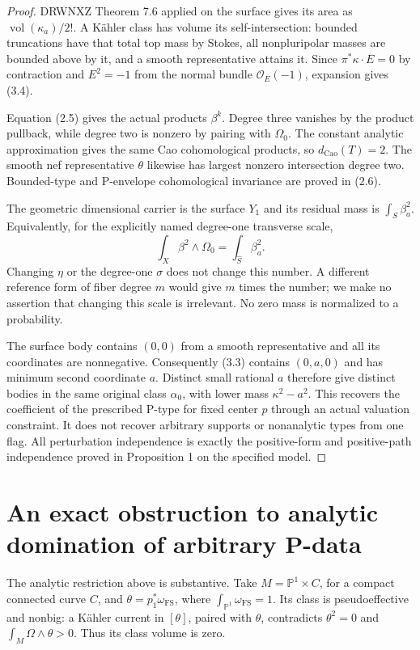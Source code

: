 \documentclass[11pt]{article}
\newcommand{\Ca}{\mathrm{Cao}}
\newcommand{\vol}{\operatorname{vol}}
\begin{document}
\begin{proof}
DRWNXZ Theorem 7.6 applied on the surface gives its area as $\vol(\kappa_a)/2!$. A K\"ahler class has volume its self-intersection: bounded truncations have that total top mass by Stokes, all nonpluripolar masses are bounded above by it, and a smooth representative attains it. Since $\pi^*\kappa\cdot E=0$ by contraction and $E^2=-1$ from the normal bundle $\mathcal O_E(-1)$, expansion gives (3.4).

Equation (2.5) gives the actual products $\beta^k$. Degree three vanishes by the product pullback, while degree two is nonzero by pairing with $\Omega_0$. The constant analytic approximation gives the same Cao cohomological products, so $d_{\Ca}(T)=2$. The smooth nef representative $\theta$ likewise has largest nonzero intersection degree two. Bounded-type and P-envelope cohomological invariance are proved in (2.6).

The geometric dimensional carrier is the surface $Y_1$ and its residual mass is $\int_{\widehat S}\beta_a^2$. Equivalently, for the explicitly named degree-one transverse scale,
\[
 \int_X\beta^2\wedge\Omega_0=\int_{\widehat S}\beta_a^2.
\]
Changing $\eta$ or the degree-one $\sigma$ does not change this number. A different reference form of fiber degree $m$ would give $m$ times the number; we make no assertion that changing this scale is irrelevant. No zero mass is normalized to a probability.

The surface body contains $(0,0)$ from a smooth representative and all its coordinates are nonnegative. Consequently (3.3) contains $(0,a,0)$ and has minimum second coordinate $a$. Distinct small rational $a$ therefore give distinct bodies in the same original class $\alpha_0$, with lower mass $\kappa^2-a^2$. This recovers the coefficient of the prescribed P-type for fixed center $p$ through an actual valuation constraint. It does not recover arbitrary supports or nonanalytic types from one flag. All perturbation independence is exactly the positive-form and positive-path independence proved in Proposition 1 on the specified model.
\end{proof}

\section{An exact obstruction to analytic domination of arbitrary P-data}
The analytic restriction above is substantive. Take $M=\mathbb P^1\times C$, for a compact connected curve $C$, and $\theta=p_1^*\omega_{\mathrm{FS}}$, where $\int_{\mathbb P^1}\omega_{\mathrm{FS}}=1$. Its class is pseudoeffective and nonbig: a K\"ahler current in $[\theta]$, paired with $\theta$, contradicts $\theta^2=0$ and $\int_M\Omega\wedge\theta>0$. Thus its class volume is zero.
\end{document}
